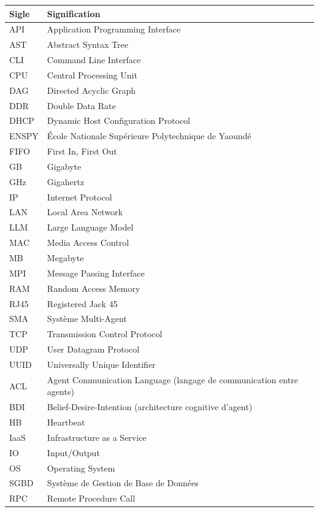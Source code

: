 \documentclass[12pt,a4paper]{report}
\begin{document}
\begin{table}[H]
\centering
\begin{tabular}{ll}
\toprule
\textbf{Sigle} & \textbf{Signification} \\
\midrule

API & Application Programming Interface \\
AST & Abstract Syntax Tree \\

CLI & Command Line Interface \\
CPU & Central Processing Unit \\
DAG & Directed Acyclic Graph \\
DDR & Double Data Rate \\
DHCP & Dynamic Host Configuration Protocol \\
ENSPY & École Nationale Supérieure Polytechnique de Yaoundé \\
FIFO & First In, First Out \\
GB & Gigabyte \\
GHz & Gigahertz \\

IP & Internet Protocol \\
LAN & Local Area Network \\
LLM & Large Language Model \\
MAC & Media Access Control \\
MB & Megabyte \\
MPI & Message Passing Interface \\
RAM & Random Access Memory \\
RJ45 & Registered Jack 45 \\
SMA & Système Multi-Agent \\
TCP & Transmission Control Protocol \\
UDP & User Datagram Protocol \\
UUID & Universally Unique Identifier \\

ACL & Agent Communication Language (langage de communication entre agents) \\
BDI & Belief-Desire-Intention (architecture cognitive d’agent) \\
HB & Heartbeat \\
IaaS & Infrastructure as a Service \\
IO & Input/Output \\
OS & Operating System \\
SGBD & Système de Gestion de Base de Données \\
RPC & Remote Procedure Call \\

\bottomrule
\end{tabular}
\end{table}
\end{document}
